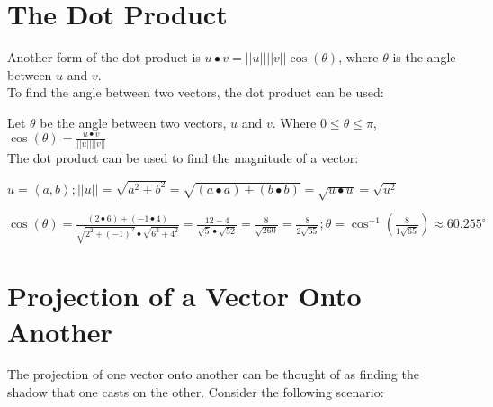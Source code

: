 \documentclass{report}
\begin{document}
\section{The Dot Product}


Another form of the dot product is $u \bullet v=||u||||v||\cos(\theta)$, where $\theta$ is the angle between $u$ and $v$.\\

To find the angle between two vectors, the dot product can be used:

Let $\theta$ be the angle between two vectors, $u$ and $v$. Where $0\le\theta\le\pi$, $\cos(\theta)=\frac{u \bullet v}{||u||||v||}$\\

The dot product can be used to find the magnitude of a vector:

$u=\left\langle a,b \right\rangle;||u||=\sqrt{a^2+b^2}=\sqrt{(a \bullet a)+(b \bullet b)}=\sqrt{u \bullet u}=\sqrt{u^2}$



\sol $\cos(\theta)=\frac{(2 \bullet 6)+(-1 \bullet 4)}{\sqrt{2^2+(-1)^2}\bullet\sqrt{6^2+4^2}}=\frac{12-4}{\sqrt{5}\bullet\sqrt{52}}=\frac{8}{\sqrt{260}}=\frac{8}{2\sqrt{65}};\theta=\cos^{-1}(\frac{8}{1\sqrt{65}})\approx \boxed{60.255^\circ}$

\section{Projection of a Vector Onto Another}

The projection of one vector onto another can be thought of as finding the shadow that one casts on the other. Consider the following scenario:

\begin{center}
\end{center}
\end{document}
